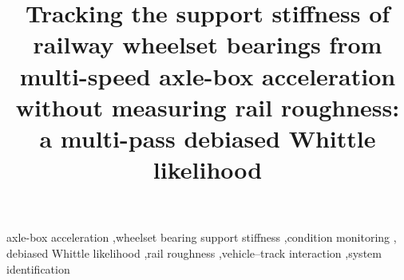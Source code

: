 \documentclass[a4paper,fleqn]{cas-sc}
\begin{document}
\let\WriteBookmarks\relax
\def\floatpagepagefraction{1}
\def\textpagefraction{.001}



\title[mode=title]{Tracking the support stiffness of railway wheelset bearings from multi-speed
axle-box acceleration without measuring rail roughness: a multi-pass debiased Whittle likelihood}



\begin{keywords}
axle-box acceleration \sep wheelset bearing support stiffness \sep condition monitoring \sep
debiased Whittle likelihood \sep rail roughness \sep vehicle--track interaction \sep system identification
\end{keywords}

\maketitle
\linenumbers












\end{document}
